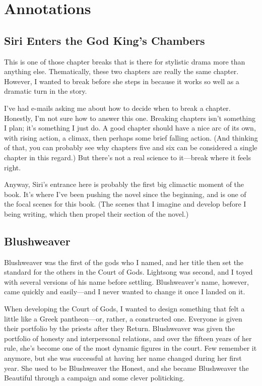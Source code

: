 \section*{Annotations}

\subsection*{Siri Enters the God King’s Chambers}

This is one of those chapter breaks that is there for stylistic drama more than anything else. Thematically, these two chapters are really the same chapter. However, I wanted to break before she steps in because it works so well as a dramatic turn in the story.

I’ve had e-mails asking me about how to decide when to break a chapter. Honestly, I’m not sure how to answer this one. Breaking chapters isn’t something I plan; it’s something I just do. A good chapter should have a nice arc of its own, with rising action, a climax, then perhaps some brief falling action. (And thinking of that, you can probably see why chapters five and six can be considered a single chapter in this regard.) But there’s not a real science to it—break where it feels right.

Anyway, Siri’s entrance here is probably the first big climactic moment of the book. It’s where I’ve been pushing the novel since the beginning, and is one of the focal scenes for this book. (The scenes that I imagine and develop before I being writing, which then propel their section of the novel.)

\subsection*{Blushweaver}

Blushweaver was the first of the gods who I named, and her title then set the standard for the others in the Court of Gods. Lightsong was second, and I toyed with several versions of his name before settling. Blushweaver’s name, however, came quickly and easily—and I never wanted to change it once I landed on it.

When developing the Court of Gods, I wanted to design something that felt a little like a Greek pantheon—or, rather, a constructed one. Everyone is given their portfolio by the priests after they Return. Blushweaver was given the portfolio of honesty and interpersonal relations, and over the fifteen years of her rule, she’s become one of the most dynamic figures in the court. Few remember it anymore, but she was successful at having her name changed during her first year. She used to be Blushweaver the Honest, and she became Blushweaver the Beautiful through a campaign and some clever politicking.

